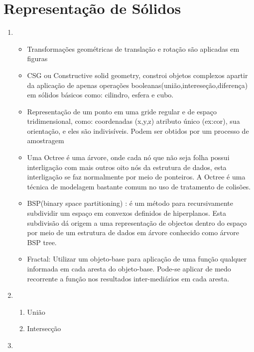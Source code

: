 \section*{Representação de Sólidos}

	\begin{enumerate}[label=\arabic*)]
	\addtocounter{enumi}{3}
		\item 

		\begin{itemize}
		\item 
		Transformações geométricas de translação e rotação são aplicadas
		em figuras
		
		\item 
		CSG ou Constructive solid geometry, constroi objetos complexos apartir da aplicação de
		 apenas operações booleanas(união,intereseção,diferença) em sólidos básicos
		 como: cilindro, esfera e cubo.
		 
		\item 
		Representação de um ponto em uma gride regular e de espaço tridimensional, como: 
		coordenadas (x,y,z) atributo único (ex:cor), sua orientação, e eles são indivisíveis. Podem
		ser obtidos por um processo de amostragem
		
		\item 
       Uma Octree é uma árvore, onde cada nó que não seja folha possui interligação com mais  
        outros oito nós da estrutura de dados, esta interligação se faz normalmente por meio de
         ponteiros. A Octree é uma técnica de modelagem bastante comum no uso de 	         
          tratamento de colisões. 
          
		\item 
		BSP(binary space partitioning) : é um método para recursivamente subdividir um espaço em    
		 convexos definidos de hiperplanos. Esta subdivisão dá origem a uma representação de
		 objectos dentro do espaço por meio de um estrutura de dados em árvore conhecido como
		 árvore BSP tree. 
		 
		\item 
		
		Fractal: Utilizar um objeto-base para aplicação de uma função
		qualquer informada em cada aresta do objeto-base.
		Pode-se aplicar de medo recorrente a função nos 
		resultados inter-mediários em cada aresta.
		\end{itemize}		
		
		\item 

		\begin{enumerate}[label=\alph*)]
			\item União		
		
			\item Intersecção	
		\end{enumerate}				
		
		\item 
	\end{enumerate}
	
\newpage